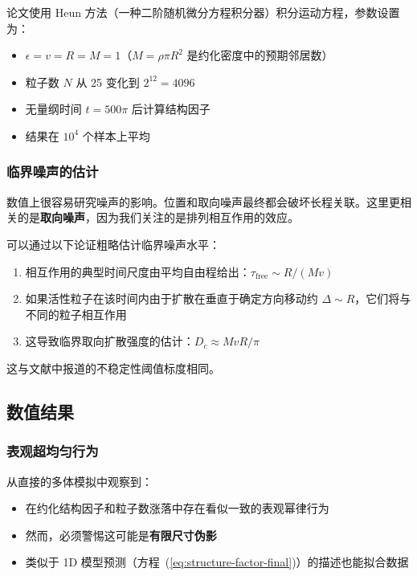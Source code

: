 论文使用 Heun 方法（一种二阶随机微分方程积分器）积分运动方程，参数设置为：
\begin{itemize}
    \item $\epsilon = v = R = M = 1$（$M = \rho\pi R^2$ 是约化密度中的预期邻居数）
    \item 粒子数 $N$ 从 25 变化到 $2^{12} = 4096$
    \item 无量纲时间 $t = 500\pi$ 后计算结构因子
    \item 结果在 $10^4$ 个样本上平均
\end{itemize}

\subsubsection{临界噪声的估计}

数值上很容易研究噪声的影响。位置和取向噪声最终都会破坏长程关联。这里更相关的是\textbf{取向噪声}，因为我们关注的是排列相互作用的效应。

可以通过以下论证粗略估计临界噪声水平：
\begin{enumerate}
    \item 相互作用的典型时间尺度由平均自由程给出：$\tau_{\text{free}} \sim R/(Mv)$
    \item 如果活性粒子在该时间内由于扩散在垂直于确定方向移动约 $\Delta \sim R$，它们将与不同的粒子相互作用
    \item 这导致临界取向扩散强度的估计：$D_c \approx MvR/\pi$
\end{enumerate}

这与文献\cite{boltz2025}中报道的不稳定性阈值标度相同。

\subsection{数值结果}

\subsubsection{表观超均匀行为}

从直接的多体模拟中观察到：
\begin{itemize}
    \item 在约化结构因子和粒子数涨落中存在看似一致的表观幂律行为
    \item 然而，必须警惕这可能是\textbf{有限尺寸伪影}
    \item 类似于 1D 模型预测（方程~(\ref{eq:structure-factor-final})）的描述也能拟合数据
\end{itemize}

